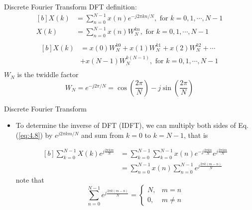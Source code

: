\documentclass[pdflatex,compress,mathserif]{beamer}
\begin{document}
\begin{frame}{Discrete Fourier Transform}
    DFT definition:
    \begin{equation}
        \begin{aligned}[b]
            X(k) &= \sum_{n=0}^{N-1} x(n)e^{-j2\pi kn / N},\text{ for } k = 0,1, \cdots, N-1 \\
            X(k) &= \sum_{n=0}^{N-1} x(n)W_N^{kn},\text{ for } k = 0,1, \cdots, N-1 \\
        \end{aligned}
        \label{eq:4.8}
    \end{equation}
    \begin{equation}
        \begin{aligned}[b]
            X(k) &= x(0)W_N^{k0} + x(1)W_N^{k1} + x(2)W_N^{k2} + \cdots \\
            &+ x(N-1)W_N^{k(N-1)},\text{ for } k = 0,1, \cdots, N-1 \\
        \end{aligned}
        \label{eq:4.9}
    \end{equation}
    $W_N$ is the twiddle factor
    \begin{equation}
        W_N = e^{-j2\pi /N} = \cos(\frac{2\pi}{N}) - j\sin(\frac{2\pi}{N})
    \end{equation}
\end{frame}

\begin{frame}{Discrete Fourier Transform}
    \begin{itemize}
        \item To determine the inverse of DFT (IDFT), we can multiply both sides of Eq. (\ref{eq:4.8}) by $e^{j2 \pi k m /N}$ and sum from $k = 0$ to $k = N - 1$, that is
        
        \begin{equation}
            \begin{aligned}[b]
                \sum_{k=0}^{N-1} X(k)e^{j\frac{2\pi km}{N}} &= \sum_{k=0}^{N-1} \sum_{k=0}^{N-1} x(n)e^{-j\frac{2\pi kn}{N}}e^{j\frac{2\pi km}{N}} \\
                &= \sum_{n=0}^{N-1} x(n) \sum_{n=0}^{N-1} e^{j\frac{2\pi k(m-n)}{N}}
            \end{aligned}
            \label{eq:4.11}
        \end{equation}
        note that
        \begin{equation}
            \sum_{n=0}^{N-1} e^{j\frac{2\pi k(m-n)}{N}} = \begin{cases}
                N,& m = n\\
                0,& m \neq n
            \end{cases}
        \end{equation}
    \end{itemize}
\end{frame}
\end{document}
